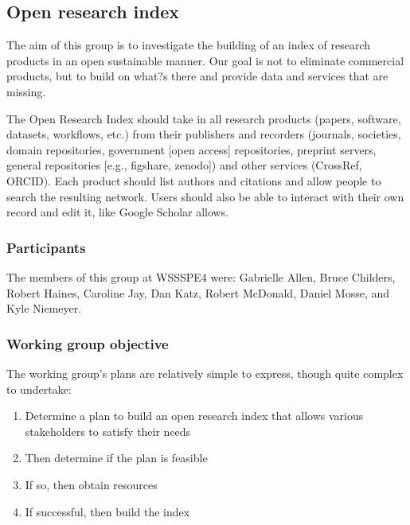 \subsection{Open research index}
\label{sec:open-research-index}


The aim of this group is to investigate the building of an index of research products in an open sustainable manner.  Our goal is not to eliminate commercial products, but to build on what?s there and provide data and services that are missing.

The Open Research Index should take in all research products (papers, software, datasets, workflows, etc.) from their publishers and recorders (journals, societies, domain repositories, government [open access] repositories, preprint servers, general repositories [e.g., figshare, zenodo]) and other services (CrossRef, ORCID).
Each product should list authors and citations and allow people to search the resulting network.
Users should also be able to interact with their own record and edit it, like Google Scholar allows.

\subsubsection{Participants}

The members of this group at WSSSPE4 were:
Gabrielle Allen,
Bruce Childers,
Robert Haines,
Caroline Jay,
Dan Katz,
Robert McDonald,
Daniel Mosse,
and 
Kyle Niemeyer.

\subsubsection{Working group objective}

The working group's plans are relatively simple to express, though quite complex to undertake:

\begin{enumerate}
\item Determine a plan to build an open research index that allows various stakeholders to satisfy their needs
\item Then determine if the plan is feasible
\item If so, then obtain resources
\item If successful, then build the index
\end{enumerate}

